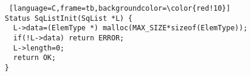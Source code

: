 \begin{lstlisting} [language=C,frame=tb,backgroundcolor=\color{red!10}]
Status SqListInit(SqList *L) {
  L->data=(ElemType *) malloc(MAX_SIZE*sizeof(ElemType));
  if(!L->data) return ERROR;
  L->length=0;
  return OK;
}
\end{lstlisting}
